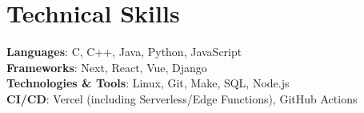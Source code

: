 \documentclass[letterpaper,11pt]{article}
\begin{document}
%
\section{Technical Skills}
 \begin{itemize}[leftmargin=0.15in, label={}]
    \small{\item{
     \textbf{Languages}{: C, C++, Java, Python, JavaScript } \\
     \textbf{Frameworks}{: Next, React, Vue, Django } \\
     \textbf{Technologies \& Tools}{: Linux, Git, Make, SQL, Node.js } \\
     \textbf{CI/CD}{: Vercel (including Serverless/Edge Functions), GitHub Actions }
    }}
 \end{itemize}




\end{document}
